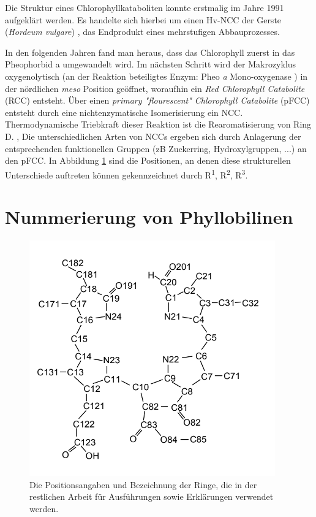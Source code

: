 Die Struktur eines Chlorophyllkataboliten konnte erstmalig im Jahre 1991 aufgeklärt werden. Es handelte sich hierbei um einen Hv-\gls{NCC} der Gerste (\textit{Hordeum vulgare}) \cite{ErsterKatabolit}, das Endprodukt eines mehrstufigen Abbauprozesses. 

In den folgenden Jahren fand man heraus, dass das Chlorophyll zuerst in das Pheophorbid a umgewandelt wird. Im nächsten Schritt wird der Makrozyklus oxygenolytisch (an der Reaktion beteiligtes Enzym: Pheo \textit{a} Mono-oxygenase \cite{ChlorophyllCatabolitesEnzyme}) in der nördlichen \textit{meso} Position geöffnet, woraufhin ein \textit{Red Chlorophyll Catabolite} (RCC) entsteht. 
Über einen \textit{primary "flourescent" Chlorophyll Catabolite} (pFCC) entsteht durch eine nichtenzymatische Isomerisierung ein \gls{NCC}. Thermodynamische Triebkraft dieser Reaktion ist die Rearomatisierung von Ring D. \cite{FCCKatabolit}, \cite{ChlorophyllCatabolites} Die unterschiedlichen Arten von \gls{NCC}s ergeben sich durch Anlagerung der entsprechenden funktionellen Gruppen (\gls{zB} Zuckerring, Hydroxylgruppen, ...) an den pFCC. \cite{ChlorophyllCatabolites} In Abbildung \ref{fig:Chlorophyllabbau} sind die Positionen, an denen diese strukturellen Unterschiede auftreten können gekennzeichnet durch R\textsuperscript{1}, R\textsuperscript{2}, R\textsuperscript{3}.

\section{Nummerierung von Phyllobilinen}

\begin{figure}[!hbtp]
  \centering
  \includegraphics[scale=0.61]{figures/Kapitel2/VWA_Chl-Nummerierung.png}
  \caption[Nummerierung von Phyllobilinen, Quelle: Mathias Scherl]{Die Positionsangaben und Bezeichnung der Ringe, die in der restlichen Arbeit für Ausführungen sowie Erklärungen verwendet werden.}
  \label{fig:Chlorophyllabbau}
\end{figure}




